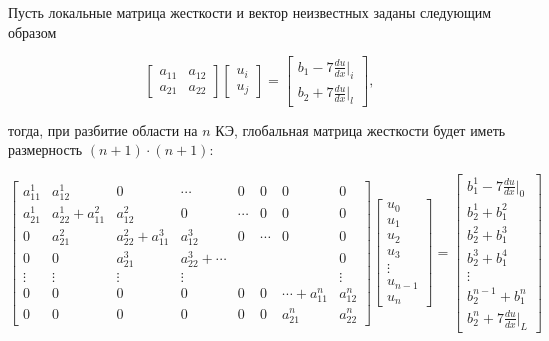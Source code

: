 Пусть локальные матрица жесткости и вектор неизвестных заданы следующим образом

$$
\begin{bmatrix}
a_{11}     &   a_{12}\\
a_{21}     &    a_{22}
\end{bmatrix}
\begin{bmatrix}
u_i \\
u_j
\end{bmatrix} =
\begin{bmatrix}
b_1   -7  \frac{du}{dx}|_i \\
b_2   +7  \frac{du}{dx}|_l
\end{bmatrix},$$

тогда, при разбитие области на $n$ КЭ, глобальная матрица жесткости  будет иметь размерность $(n+1)\cdot(n+1)$:

$$ \begin{bmatrix}
a_{11}^1     &   a_{12}^1         &   0 & \cdots & 0 & 0 & 0  & 0\\
a_{21}^1     &    a_{22}^1+a_{11}^2 & a_{12}^2  & 0 & \cdots & 0 & 0  & 0\\
0     &    a_{21}^2 & a_{22}^2+a_{11}^3  &  a_{12}^3  & 0 & \cdots & 0  & 0\\
0     &    0  & a_{21}^3  & a_{22}^3+ \cdots  &  & &   & 0\\
\vdots & \vdots & \vdots & \vdots &  &  &   & \vdots\\
0 & 0 & 0 & 0 &  0 & 0 & \cdots+a_{11}^n  & a_{12}^n\\
0 & 0 & 0 & 0 &  0 & 0 & a_{21}^n  & a_{22}^n
\end{bmatrix}
\begin{bmatrix}
u_0 \\
u_1 \\
u_2\\
u_3\\
\vdots\\
u_{n-1}\\
u_n
\end{bmatrix} =
\begin{bmatrix}
b_1^1   -7  \frac{du}{dx}|_0 \\
b_2^1+b_1^2\\
b_2^2+b_1^3\\
b_2^3+b_1^4\\
\vdots\\
b_2^{n-1}+b_1^n\\
b_2^n   +7  \frac{du}{dx}|_L
\end{bmatrix}
$$

